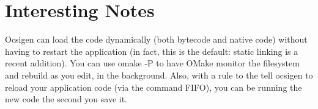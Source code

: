 \section{Interesting Notes}

Ocsigen can load the code dynamically (both bytecode and native code)
without having to restart the application (in fact, this is the
default: static linking is a recent addition). You can use omake -P to
have OMake monitor the filesystem and rebuild as you edit, in the
background. Also, with a rule to the tell ocsigen to reload your
application code (via the command FIFO), you can be running the new
code the second you save it.

